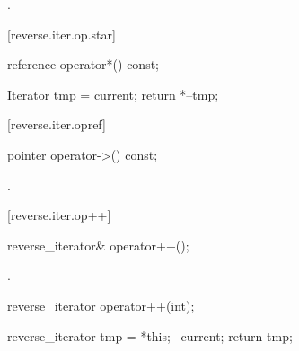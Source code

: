\begin{itemdescr}
\pnum
\returns
{}.
\end{itemdescr}

[reverse.iter.op.star]{}

%
\begin{itemdecl}
reference operator*() const;
\end{itemdecl}

\begin{itemdescr}
\pnum
\effects
\begin{codeblock}
Iterator tmp = current;
return *--tmp;
\end{codeblock}

\end{itemdescr}

\begin{removedblock}
[reverse.iter.opref]{}

%
\begin{itemdecl}
pointer operator->() const;
\end{itemdecl}

\begin{itemdescr}
\pnum
\returns {}.
\end{itemdescr}
\end{removedblock}

[reverse.iter.op++]{}

%
\begin{itemdecl}
reverse_iterator& operator++();
\end{itemdecl}

\begin{itemdescr}
\pnum
\effects
{}

\pnum
\returns
{}.
\end{itemdescr}

%
%
\begin{itemdecl}
reverse_iterator operator++(int);
\end{itemdecl}

\begin{itemdescr}
\pnum
\effects
\begin{codeblock}
reverse_iterator tmp = *this;
--current;
return tmp;
\end{codeblock}
\end{itemdescr}

